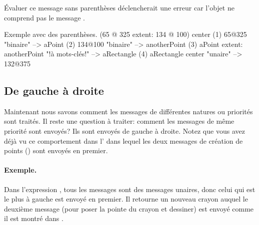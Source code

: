 \documentclass[a4paper,10pt,twoside]{book}
\begin{document}
\'Evaluer ce message sans parenth\`eses d\'eclencherait une erreur car
l'objet  ne comprend pas le message .

\begin{example}[decExtent]{Exemple avec des parenth\`eses.}{}
      (65 @ 325 extent: 134 @ 100) center
(1)   65@325                                                    "binaire"
    --> aPoint
(2)                                134@100                     "binaire"
                                 --> anotherPoint
(3)   aPoint extent: anotherPoint                       "!\`a mots-cl\'es!"
      --> aRectangle
(4)   aRectangle center                                     "unaire"
      --> 132@375
\end{example}

\subsection{De gauche \`a droite}
Maintenant nous savons comment les messages de diff\'erentes natures
ou priorit\'es sont trait\'es. Il reste une question \`a traiter:
comment les messages de m\^eme priorit\'e sont envoy\'es? Ils sont
envoy\'es de gauche \`a droite. Notez que vous avez d\'ej\`a vu ce
comportement dans l' dans lequel les deux messages de
cr\'eation de points () sont envoy\'es en premier.



\paragraph{Exemple.} Dans l'expression , tous les
messages sont des messages unaires, donc celui qui est le plus \`a
gauche  est envoy\'e en premier. Il retourne un nouveau
crayon auquel le deuxi\`eme message  
(pour poser la pointe du crayon et dessiner)
est envoy\'e comme il est montr\'e dans .
\end{document}
